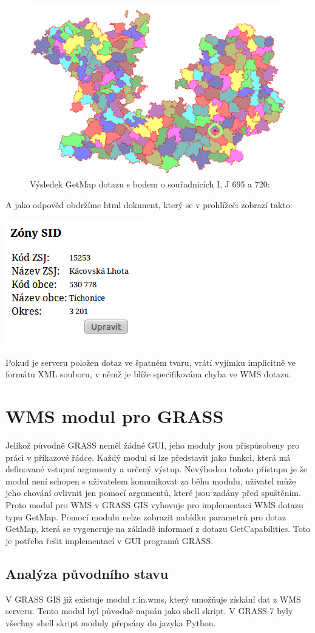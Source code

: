 \documentclass[a4paper,12pt]{article}
\begin{document}
  
\begin{figure}[h!]
 \includegraphics[scale=0.3]{figures/getfeatureinfo}
  \caption{Výsledek GetMap dotazu s bodem o souřadnicích I, J  695 a 720:}
\end{figure}

A jako odpověd obdržíme html dokunent, který se v prohlížeči zobrazí takto:

 \includegraphics[scale=0.7]{figures/getfeatureinforeply}


Pokud je serveru položen dotaz ve špatném tvaru, vrátí vyjímku implicitně ve formátu XML souboru, v němž je blíže specifikována chyba ve WMS dotazu. 


\newpage

\section{WMS modul pro GRASS}

Jelikož původně GRASS neměl žádné GUI, jeho moduly jsou přispůsobeny pro práci v příkazové řádce. Každý modul si lze představit jako funkci, která má definované vstupní argumenty a určený výstup. Nevýhodou tohoto 
přístupu je že modul není schopen s uživatelem komunikovat za běhu modulu, uživatel může jeho chování ovlivnit jen pomocí argumentů, které jsou zadány před spuštěním. Proto modul pro WMS v GRASS GIS vyhovuje pro implementaci
WMS dotazu typu GetMap. Pomocí modulu nelze zobrazit nabídku parametrů pro dotaz GetMap, která se vygeneruje na základě informací z dotazu GetCapabilities. Toto je potřeba řešit implementací v GUI programů GRASS.



\subsection{Analýza původního stavu}

 V GRASS GIS již existuje modul r.in.wms, který umožňuje získání dat z WMS serveru. Tento modul byl původně napsán jako shell skript. V GRASS 7 byly všechny shell skript moduly přepsány do jazyka Python.      
\end{document}
